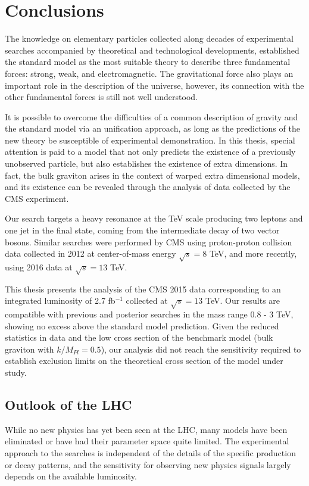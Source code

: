 \chapter{Conclusions}

The knowledge on elementary particles collected along decades of experimental searches accompanied by theoretical and technological developments, established the standard model as the most suitable theory to describe three fundamental forces: strong, weak, and electromagnetic. The gravitational force also plays an important role in the description of the universe, however, its connection with the other fundamental forces is still not well understood.

It is possible to overcome the difficulties of a common description of gravity and the standard model via an unification approach, as long as the predictions of the new theory be susceptible of experimental demonstration. In this thesis, special attention is paid to a model that not only predicts the existence of a previously unobserved particle, but also establishes the existence of extra dimensions. In fact, the bulk graviton arises in the context of warped extra dimensional models, and its existence can be revealed through the analysis of data collected by the CMS experiment. 

Our search targets a heavy resonance at the TeV scale producing two leptons and one jet in the final state, coming from the intermediate decay of two vector bosons. Similar searches were performed by CMS using proton-proton collision data collected in 2012 at center-of-mass energy $\sqrt{s} = 8$ TeV, and more recently, using 2016 data at $\sqrt{s}=13$ TeV. 

This thesis presents the analysis of the CMS 2015 data corresponding to an integrated luminosity of 2.7 fb$^{-1}$ collected at $\sqrt{s}=13$ TeV. Our results \cite{CMS-PAS-B2G-16-010} are compatible with previous \cite{Khachatryan:2014gha} and posterior \cite{CMS-PAS-B2G-16-022,CMS-PAS-HIG-16-034} searches in the mass range 0.8 - 3 TeV, showing no excess above the standard model prediction. Given the reduced statistics in data and the low cross section of the benchmark model (bulk graviton with $k/M_{Pl}=0.5$), our analysis did not reach the sensitivity required to establish exclusion limits on the theoretical cross section of the model under study.

\section*{Outlook of the LHC}
While no new physics has yet been seen at the LHC, many models have been eliminated or have had their parameter space quite limited. The experimental approach to the searches is independent of the details of the specific production or decay patterns, and the sensitivity for observing new physics signals largely depends on the available luminosity. 

